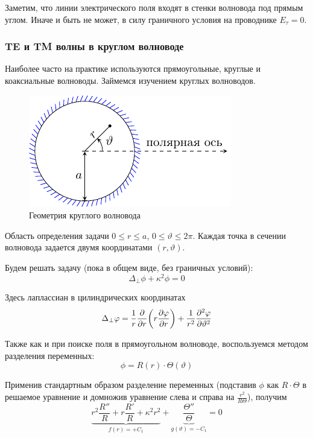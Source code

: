 Заметим, что линии электрического поля входят в стенки волновода под прямым углом. Иначе и быть не может, в силу граничного условия на проводнике $E_\tau=0$.

\subsubsection{TE и TM волны в круглом волноводе}

Наиболее часто на практике используются прямоугольные, круглые и коаксиальные волноводы. Займемся изучением круглых волноводов.

\begin{figure}[ht]
	\centering
	\includegraphics[scale=1.65]{img_lect5/cylindric/geometry}
	\caption{Геометрия круглого волновода}
	\label{fig:cylinder:geometry}
\end{figure}

Область определения задачи $0\leq r \leq a$, $0\leq \vartheta \leq 2\pi$. Каждая точка в сечении волновода задается двумя координатами $(r,\vartheta)$.

Будем решать задачу (пока в общем виде, без граничных условий):
\begin{equation}
	\Delta_\perp \phi+\kappa^2\phi=0
\end{equation}

Здесь лаплассиан в цилиндрических координатах
\begin{equation}
	\Delta_\perp\varphi=\frac{1}{r}\pdv{r}\qty(r\pdv{\varphi}{r})+\frac{1}{r^2}\pdv[2]{\varphi}{\vartheta}
\end{equation}

Также как и при поиске поля в прямоугольном волноводе, воспользуемся методом разделения переменных:
\begin{equation}
	\phi=R(r)\cdot\Theta(\vartheta)
\end{equation}

Применив стандартным образом разделение переменных (подставив $\phi$ как $R\cdot\Theta$ в решаемое уравнение и домножив уравнение слева и справа на $\frac{r^2}{R\Theta}$), получим
\begin{equation}
	\underbrace{r^2\frac{R''}{R}+r\frac{R'}{R}+\kappa^2r^2}_{f(r)=+C_1}+
	\underbrace{\frac{\Theta''}{\Theta}}_{g(\vartheta)=-C_1}
	=0
\end{equation}

